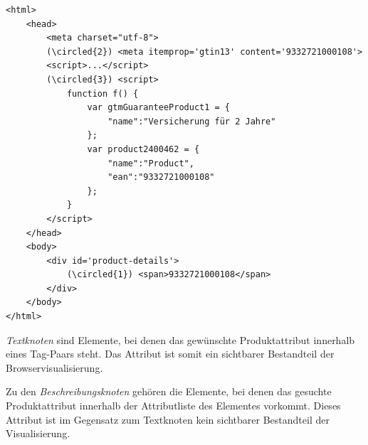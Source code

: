 \vspace{0.25cm}
\begin{minipage}[c]{\textwidth} %
    \begin{lstlisting}[label={code:examples}]
<html>
    <head>
        <meta charset="utf-8">
        (\circled{2}) <meta itemprop='gtin13' content='9332721000108'>
        <script>...</script>
        (\circled{3}) <script>
            function f() {
                var gtmGuaranteeProduct1 = {
                    "name":"Versicherung für 2 Jahre"
                };
                var product2400462 = {
                    "name":"Product",
                    "ean":"9332721000108"
                };
            }
        </script>
    </head>
    <body>
        <div id='product-details'>
            (\circled{1}) <span>9332721000108</span>
        </div>
    </body>
</html>
    \end{lstlisting}
    \vspace{-0.25cm}
    \vspace{0.25cm}
\end{minipage}

\textit{Textknoten} sind Elemente, bei denen das gewünschte Produktattribut innerhalb eines Tag-Paars steht.
Das Attribut ist somit ein sichtbarer Bestandteil der Browservisualisierung.

Zu den \textit{Beschreibungsknoten} gehören die Elemente, bei denen das gesuchte Produktattribut innerhalb der
Attributliste des Elementes vorkommt.
Dieses Attribut ist im Gegensatz zum Textknoten kein sichtbarer Bestandteil der Visualisierung.

